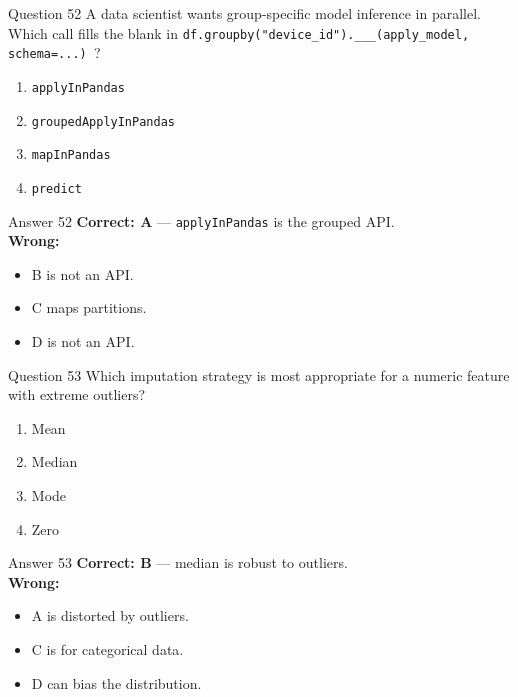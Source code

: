 \documentclass[aspectratio=169,11pt]{beamer}
\begin{document}
	\begin{frame}{Question 52}
		A data scientist wants group-specific model inference in parallel. Which call fills the blank in \texttt{df.groupby("device\_id").\_\_\_(apply\_model, schema=...) }?
		\begin{enumerate}[label=\Alph*.]
			\item \texttt{applyInPandas}
			\item \texttt{groupedApplyInPandas}
			\item \texttt{mapInPandas}
			\item \texttt{predict}
		\end{enumerate}
	\end{frame}
	\begin{frame}{Answer 52}
		\textbf{Correct: A} --- \texttt{applyInPandas} is the grouped API.\\
		\vspace{0.5em}
		\textbf{Wrong:}
		\begin{itemize}
			\item B is not an API.
			\item C maps partitions.
			\item D is not an API.
		\end{itemize}
	\end{frame}
	
	\begin{frame}{Question 53}
		Which imputation strategy is most appropriate for a numeric feature with extreme outliers?
		\begin{enumerate}[label=\Alph*.]
			\item Mean
			\item Median
			\item Mode
			\item Zero
		\end{enumerate}
	\end{frame}
	\begin{frame}{Answer 53}
		\textbf{Correct: B} --- median is robust to outliers.\\
		\vspace{0.5em}
		\textbf{Wrong:}
		\begin{itemize}
			\item A is distorted by outliers.
			\item C is for categorical data.
			\item D can bias the distribution.
		\end{itemize}
	\end{frame}
	
\end{document}

